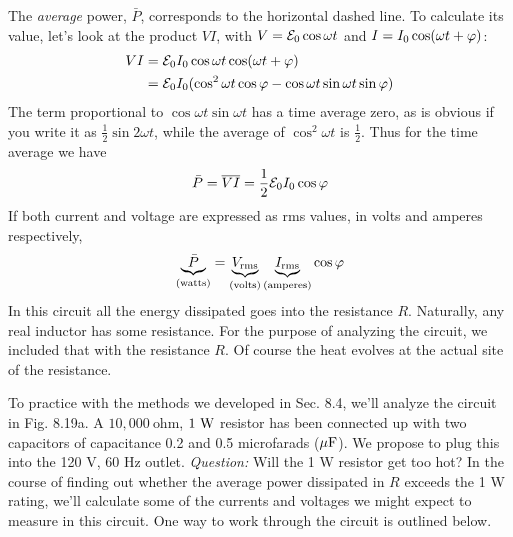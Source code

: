 The \emph{average} power, $\bar{P}$, corresponds to the horizontal dashed line.
To calculate its value, let's look at the product $VI$, with $V = \mathcal{E}_0 \cos \omega t$
and $I = I_0\cos(\omega t+\varphi)$:
\begin{align}
\begin{split}
  VI &= \mathcal{E}_0I_0\cos\omega t \cos(\omega t+\varphi) \\
     &= \mathcal{E}_0I_0(\cos^2\omega t\cos\varphi - \cos\omega t\sin\omega t\sin\varphi)
\end{split}
\end{align}
The term proportional to $\cos\omega t\sin\omega t$ has a time average
zero, as is obvious if you write it as $\frac{1}{2}\sin2\omega t$, while
the average of $\cos^2\omega t$ is $\frac{1}{2}$.
Thus for the time average we have
\begin{equation}
  \bar{P} = \overline{VI} = \frac{1}{2}\mathcal{E}_0I_0\cos\varphi
\end{equation}
If both current and voltage are expressed as rms values, in volts and
amperes respectively,
\begin{equation}
  \underbrace{\bar{P}}_\text{(watts)}
        = \underbrace{V_\text{rms}}_\text{(volts)}
          \underbrace{I_\text{rms}}_\text{(amperes)}
          \cos\varphi
\end{equation}
In this circuit all the energy dissipated goes into the resistance $R$.
Naturally, any real inductor has some resistance. For the purpose
of analyzing the circuit, we included that with the resistance $R$. Of
course the heat evolves at the actual site of the resistance.

To practice with the methods we developed in Sec. 8.4, we'll analyze
the circuit in Fig. 8.19a. A $10,000\ \text{ohm}$, $1\ \textup{W}$ resistor has been
connected up with two capacitors of capacitance 0.2 and 0.5 microfarads
($\mu\textup{F}$). We propose to plug this into the 120 V, 60 Hz outlet.
\emph{Question:} Will the 1 W resistor get too hot? In the course
of finding out whether the average power dissipated in $R$ exceeds the
1 W rating, we'll calculate some of the currents and voltages we
might expect to measure in this circuit. One way to work through the
circuit is outlined below.

